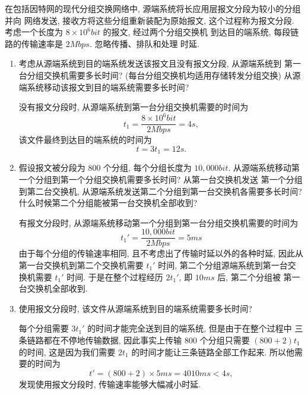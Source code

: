 \documentclass[10pt,UTF8]{book} %
\begin{document}
\begin{example}
    在包括因特网的现代分组交换网络中, 源端系统将长应用层报文分段为较小的分组并向
    网络发送, 接收方将这些分组重新装配为原始报文, 这个过程称为报文分段.
    考虑一个长度为 $8 \times 10^6 \si{bit}$ 的报文, 经过两个分组交换机
    到达目的端系统, 每段链路的传输速率是 $2 \si{Mbps}$. 忽略传播、排队和处理
    时延.
    \begin{enumerate}[label={$\left.\mathrm{\alph*}\right)$}, itemsep=0pt]
        \item 考虑从源端系统到目的端系统发送该报文且没有报文分段, 从源端系统到
        第一台分组交换机需要多长时间? (每台分组交换机均适用存储转发分组交换)
        从源端系统移动该报文到目的端系统需要多长时间?
        \begin{sol}
            没有报文分段时, 从源端系统到第一台分组交换机需要的时间为
            \[ t_1 = \frac{8 \times 10^6 \si{bit}}{2 \si{Mbps}} = 4\si{s}, \]
        该文件最终到达目的端系统的时间为
        \[ t = 3t_1 = 12 \si{s}. \]
        \end{sol}
        \item 假设报文被分段为 800 个分组, 每个分组长度为 $10,000\si{bit}$.
        从源端系统移动第一个分组到第一个分组交换机需要多长时间? 从第一台交换机发送
        第一个分组到第二台交换机, 从源端系统发送第二个分组到第一台交换机各需要多长时间?
        什么时候第二个分组能被第一台交换机全部收到?
        \begin{sol}
            有报文分段时, 从源端系统移动第一个分组到第一台分组交换机需要的时间为
            \[ t_1' = \frac{10,000 \si{bit}}{2 \si{Mbps}} = 5\si{ms} \]
            由于每个分组的传输速率相同, 且不考虑出了传输时延以外的各种时延,
            因此从第一台交换机到第二个交换机需要 $t_1'$ 时间,
            第二个分组源端系统到第一台交换机需要 $t_1'$ 时间.
            于是在整个过程经历 $2t_1'$, 即 $10\si{ms}$ 后, 第二个分组被
            第一台交换机全部收到.
        \end{sol}
        \item 使用报文分段时, 该文件从源端系统到目的端系统需要多长时间?
        \begin{sol}
            每个分组需要 $3t_1'$ 的时间才能完全送到目的端系统, 但是由于在整个过程中
            三条链路都在不停地传输数据, 因此事实上传输 800 个分组只需要 $(800+2)t_1$
            的时间, 这是因为我们需要 $2t_1$ 的时间才能让三条链路全部工作起来.
            所以他需要的时间为
            \[ t' = (800+2) \times 5\si{ms} = 4010 \si{ms} < 4\si{s}, \]
            发现使用报文分段时, 传输速率能够大幅减小时延.
        \end{sol}

\end{enumerate}
\end{example}
\end{document}
